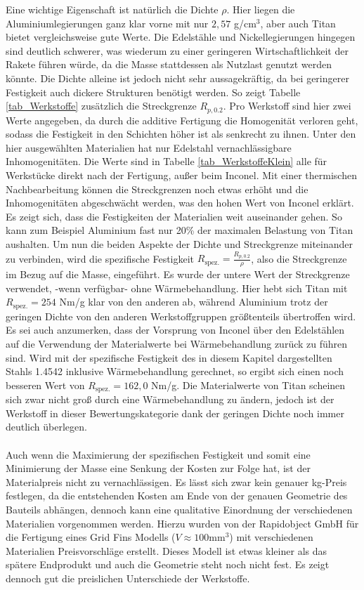 Eine wichtige Eigenschaft ist natürlich die Dichte $\rho$. Hier liegen die Aluminiumlegierungen ganz klar vorne mit nur $2,57$ g/cm$^3$, aber auch Titan bietet vergleichsweise gute Werte. Die Edelstähle und Nickellegierungen hingegen sind deutlich schwerer, was wiederum zu einer geringeren Wirtschaftlichkeit der Rakete führen würde, da die Masse stattdessen als Nutzlast genutzt werden könnte. Die Dichte alleine ist jedoch nicht sehr aussagekräftig, da bei geringerer Festigkeit auch dickere Strukturen benötigt werden. So zeigt Tabelle \ref{tab_Werkstoffe} zusätzlich die Streckgrenze $R_{p,0.2}$. Pro Werkstoff sind hier zwei Werte angegeben, da durch die additive Fertigung die Homogenität verloren geht, sodass die Festigkeit in den Schichten höher ist als senkrecht zu ihnen. Unter den hier ausgewählten Materialien hat nur Edelstahl vernachlässigbare Inhomogenitäten. Die Werte sind in Tabelle \ref{tab_WerkstoffeKlein} alle für Werkstücke direkt nach der Fertigung, außer beim Inconel. Mit einer thermischen Nachbearbeitung können die Streckgrenzen noch etwas erhöht und die Inhomogenitäten abgeschwächt werden, was den hohen Wert von Inconel erklärt. Es zeigt sich, dass die Festigkeiten der Materialien weit auseinander gehen. So kann zum Beispiel Aluminium fast nur 20\% der maximalen Belastung von Titan aushalten. Um nun die beiden Aspekte der Dichte und Streckgrenze miteinander zu verbinden, wird die spezifische Festigkeit $R_\mathrm{spez.}=\frac{R_{p,0.2}}{\rho}$, also die Streckgrenze im Bezug auf die Masse, eingeführt. Es wurde der untere Wert der Streckgrenze verwendet, -wenn verfügbar- ohne Wärmebehandlung. Hier hebt sich Titan mit $R_\mathrm{spez.}=254$ Nm/g klar von den anderen ab, während Aluminium trotz der geringen Dichte von den anderen Werkstoffgruppen größtenteils übertroffen wird. Es sei auch anzumerken, dass der Vorsprung von Inconel über den Edelstählen auf die Verwendung der Materialwerte bei Wärmebehandlung zurück zu führen sind. Wird mit der spezifische Festigkeit des in diesem Kapitel dargestellten Stahls 1.4542 inklusive Wärmebehandlung gerechnet, so ergibt sich einen noch besseren Wert von $R_\mathrm{spez.} = 162,0$ Nm/g. Die Materialwerte von Titan scheinen sich zwar nicht groß durch eine Wärmebehandlung zu ändern, jedoch ist der Werkstoff in dieser Bewertungskategorie dank der geringen Dichte noch immer deutlich überlegen.
\\~\\
Auch wenn die Maximierung der spezifischen Festigkeit und somit eine Minimierung der Masse eine Senkung der Kosten zur Folge hat, ist der Materialpreis nicht zu vernachlässigen. Es lässt sich zwar kein genauer kg-Preis festlegen, da die entstehenden Kosten am Ende von der genauen Geometrie des Bauteils abhängen, dennoch kann eine qualitative Einordnung der verschiedenen Materialien vorgenommen werden. Hierzu wurden von der Rapidobject GmbH für die Fertigung eines Grid Fins Modells ($V \approx 100\mathrm{mm}^3$) mit verschiedenen Materialien Preisvorschläge erstellt. Dieses Modell ist etwas kleiner als das spätere Endprodukt und auch die Geometrie steht noch nicht fest. Es zeigt dennoch gut die preislichen Unterschiede der Werkstoffe.
